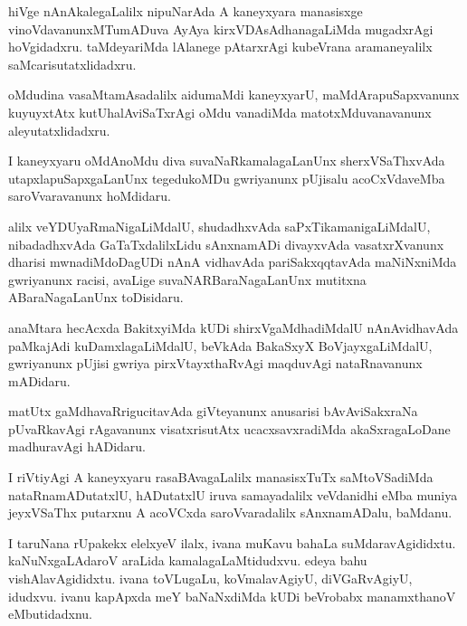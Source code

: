 \documentclass{article}
\begin{document}
\begin{mn}
hiVge nAnAkalegaLalilx nipuNarAda A kaneyxyara manasisxge vinoVdavanunxMTumADuva AyAya 
kirxVDAsAdhanagaLiMda mugadxrAgi hoVgidadxru. taMdeyariMda lAlanege pAtarxrAgi kubeVrana 
aramaneyalilx saMcarisutatxlidadxru.
\end{mn}

\begin{mn}
oMdudina vasaMtamAsadalilx aidumaMdi kaneyxyarU, maMdArapuSapxvanunx kuyuyxtAtx kutUhalAviSaTxrAgi 
oMdu vanadiMda matotxMduvanavanunx aleyutatxlidadxru.
\end{mn}

\begin{mn}
I kaneyxyaru oMdAnoMdu diva suvaNaRkamalagaLanUnx sherxVSaThxvAda utapxlapuSapxgaLanUnx tegedukoMDu
gwriyanunx pUjisalu acoCxVdaveMba saroVvaravanunx hoMdidaru.
\end{mn}

\begin{mn}
alilx veYDUyaRmaNigaLiMdalU, shudadhxvAda saPxTikamanigaLiMdalU, nibadadhxvAda GaTaTxdalilxLidu 
sAnxnamADi divayxvAda vasatxrXvanunx dharisi mwnadiMdoDagUDi nAnA vidhavAda pariSakxqqtavAda 
maNiNxniMda gwriyanunx racisi, avaLige suvaNARBaraNagaLanUnx mutitxna ABaraNagaLanUnx toDisidaru.
\end{mn}

\begin{mn}
anaMtara hecAcxda BakitxyiMda kUDi shirxVgaMdhadiMdalU nAnAvidhavAda paMkajAdi kuDamxlagaLiMdalU, 
beVkAda BakaSxyX BoVjayxgaLiMdalU, gwriyanunx pUjisi gwriya pirxVtayxthaRvAgi maqduvAgi 
nataRnavanunx mADidaru.
\end{mn}

\begin{mn}
matUtx gaMdhavaRrigucitavAda giVteyanunx anusarisi bAvAviSakxraNa pUvaRkavAgi rAgavanunx 
visatxrisutAtx ucacxsavxradiMda akaSxragaLoDane madhuravAgi hADidaru.
\end{mn}

\begin{mn}
I riVtiyAgi A kaneyxyaru rasaBAvagaLalilx manasisxTuTx saMtoVSadiMda nataRnamADutatxlU, 
hADutatxlU iruva samayadalilx veVdanidhi eMba muniya jeyxVSaThx putarxnu A acoVCxda 
saroVvaradalilx sAnxnamADalu, baMdanu.
\end{mn}

\begin{mn}
I taruNana rUpakekx elelxyeV ilalx, ivana muKavu bahaLa suMdaravAgididxtu. kaNuNxgaLAdaroV 
araLida kamalagaLaMtidudxvu. edeya bahu vishAlavAgididxtu. ivana toVLugaLu, koVmalavAgiyU, 
diVGaRvAgiyU, idudxvu. ivanu kapApxda meY baNaNxdiMda kUDi beVrobabx manamxthanoV eMbutidadxnu.
\end{mn}
\end{document}
